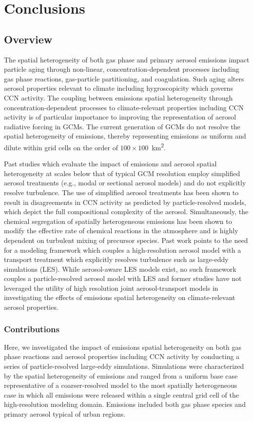 \chapter{Conclusions}

\section{Overview}
The spatial heterogeneity of both gas phase and primary aerosol emissions impact particle aging through non-linear, concentration-dependent processes including gas phase reactions, gas-particle partitioning, and coagulation. Such aging alters aerosol properties relevant to climate including hygroscopicity which governs CCN activity. The coupling between emissions spatial heterogeneity through concentration-dependent processes to climate-relevant properties including CCN activity is of particular importance to improving the representation of aerosol radiative forcing in GCMs. The current generation of GCMs do not resolve the spatial heterogeneity of emissions, thereby representing emissions as uniform and dilute within grid cells on the order of $100\times100$~\si{km^2}. 

Past studies which evaluate the impact of emissions and aerosol spatial heterogeneity at scales below that of typical GCM resolution employ simplified aerosol treatments (e.g., modal or sectional aerosol models) and do not explicitly resolve turbulence. The use of simplified aerosol treatments has been shown to result in disagreements in CCN activity as predicted by particle-resolved models, which depict the full compositional complexity of the aerosol. Simultaneously, the chemical segregation of spatially heterogeneous emissions has been shown to modify the effective rate of chemical reactions in the atmosphere and is highly dependent on turbulent mixing of precursor species. Past work points to the need for a modeling framework which couples a high-resolution aerosol model with a transport treatment which explicitly resolves turbulence such as large-eddy simulations (LES). While aerosol-aware LES models exist, no such framework couples a particle-resolved aerosol model with LES and former studies have not leveraged the utility of high resolution joint aerosol-transport models in investigating the effects of emissions spatial heterogeneity on climate-relevant aerosol properties. 

\subsection{Contributions}
Here, we investigated the impact of emissions spatial heterogeneity on both gas phase reactions and aerosol properties including CCN activity by conducting a series of particle-resolved large-eddy simulations. Simulations were characterized by the spatial heterogeneity of emissions and ranged from a uniform base case representative of a coarser-resolved model to the most spatially heterogeneous case in which all emissions were released within a single central grid cell of the high-resolution modeling domain. Emissions included both gas phase species and primary aerosol typical of urban regions. 

